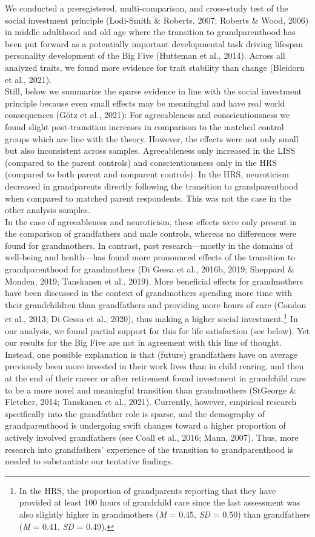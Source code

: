 \documentclass[
  english,
  man, noextraspace]{apa7}
\begin{document}
We conducted a preregistered, multi-comparison, and cross-study test of the social investment principle (Lodi-Smith \& Roberts, 2007; Roberts \& Wood, 2006) in middle adulthood and old age where the transition to grandparenthood has been put forward as a potentially important developmental task driving lifespan personality development of the Big Five (Hutteman et al., 2014). Across all analyzed traits, we found more evidence for trait stability than change (Bleidorn et al., 2021).\\
Still, below we summarize the sparse evidence in line with the social investment principle because even small effects may be meaningful and have real world consequences (Götz et al., 2021): For agreeableness and conscientiousness we found slight post-transition increases in comparison to the matched control groups which are line with the theory. However, the effects were not only small but also inconsistent across samples. Agreeableness only increased in the LISS (compared to the parent controls) and conscientiousness only in the HRS (compared to both parent and nonparent controls). In the HRS, neuroticism decreased in grandparents directly following the transition to grandparenthood when compared to matched parent respondents. This was not the case in the other analysis samples.\\
In the case of agreeableness and neuroticism, these effects were only present in the comparison of grandfathers and male controls, whereas no differences were found for grandmothers. In contrast, past research---mostly in the domains of well-being and health---has found more pronounced effects of the transition to grandparenthood for grandmothers (Di Gessa et al., 2016b, 2019; Sheppard \& Monden, 2019; Tanskanen et al., 2019). More beneficial effects for grandmothers have been discussed in the context of grandmothers spending more time with their grandchildren than grandfathers and providing more hours of care (Condon et al., 2013; Di Gessa et al., 2020), thus making a higher social investment.\footnote{In the HRS, the proportion of grandparents reporting that they have provided at least 100 hours of grandchild care since the last assessment was also slightly higher in grandmothers (\emph{M} = 0.45, \emph{SD} = 0.50) than grandfathers (\emph{M} = 0.41, \emph{SD} = 0.49).} In our analysis, we found partial support for this for life satisfaction (see below). Yet our results for the Big Five are not in agreement with this line of thought. Instead, one possible explanation is that (future) grandfathers have on average previously been more invested in their work lives than in child rearing, and then at the end of their career or after retirement found investment in grandchild care to be a more novel and meaningful transition than grandmothers (StGeorge \& Fletcher, 2014; Tanskanen et al., 2021). Currently, however, empirical research specifically into the grandfather role is sparse, and the demography of grandparenthood is undergoing swift changes toward a higher proportion of actively involved grandfathers (see Coall et al., 2016; Mann, 2007). Thus, more research into grandfathers' experience of the transition to grandparenthood is needed to substantiate our tentative findings.\\
\end{document}
